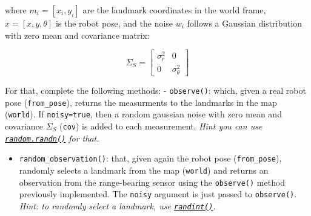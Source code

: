 \documentclass[11pt]{article}
\providecommand{\tightlist}{%
      \setlength{\itemsep}{0pt}\setlength{\parskip}{0pt}}
\begin{document}
where \(m_i=[x_i,y_i]\) are the landmark coordinates in the world frame,
\(x=[x,y,\theta]\) is the robot pose, and the noise \(w_i\) follows a
Gaussian distribution with zero mean and covariance matrix:

\[\Sigma_S = 
    \begin{bmatrix}
        \sigma^2_r & 0 \\
        0 & \sigma^2_{\theta}
    \end{bmatrix}
\]

For that, complete the following methods: - \texttt{observe()}: which,
given a real robot pose (\texttt{from\_pose}), returns the measurments
to the landmarks in the map (\texttt{world}). If \texttt{noisy=true},
then a random gaussian noise with zero mean and covariance \(\Sigma_S\)
(\texttt{cov}) is added to each measurement. \emph{Hint you can use
\href{https://docs.scipy.org/doc/numpy-1.15.1/reference/generated/numpy.random.randn.html}{\texttt{random.randn()}}
for that.}

\begin{itemize}
\tightlist
\item
  \texttt{random\_observation()}: that, given again the robot pose
  (\texttt{from\_pose}), randomly selects a landmark from the map
  (\texttt{world}) and returns an observation from the range-bearing
  sensor using the \texttt{observe()} method previously implemented. The
  \texttt{noisy} argument is just passed to \texttt{observe()}.
  \emph{Hint: to randomly select a landmark, use
  \href{https://numpy.org/doc/stable/reference/random/generated/numpy.random.randint.html}{\texttt{randint()}}.}
\end{itemize}
\end{document}
